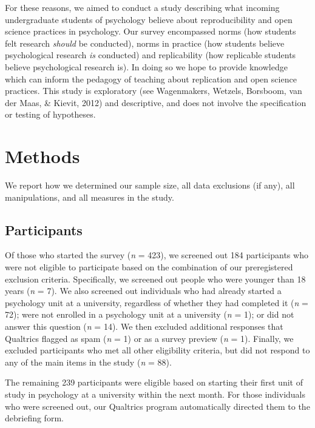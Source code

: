 \documentclass[
  man,mask,floatsintext]{apa6}
\begin{document}
For these reasons, we aimed to conduct a study describing what incoming undergraduate students of psychology believe about reproducibility and open science practices in psychology. Our survey encompassed norms (how students felt research \emph{should} be conducted), norms in practice (how students believe psychological research \emph{is} conducted) and replicability (how replicable students believe psychological research is). In doing so we hope to provide knowledge which can inform the pedagogy of teaching about replication and open science practices. This study is exploratory (see Wagenmakers, Wetzels, Borsboom, van der Maas, \& Kievit, 2012) and descriptive, and does not involve the specification or testing of hypotheses.

\hypertarget{methods}{%
\section{Methods}\label{methods}}

We report how we determined our sample size, all data exclusions (if any), all manipulations, and all measures in the study.

\hypertarget{participants}{%
\subsection{Participants}\label{participants}}

Of those who started the survey (\emph{n} = 423), we screened out 184
participants who were not eligible to participate based on the combination of our
preregistered exclusion criteria. Specifically, we screened out people who were younger than
18 years (\emph{n} = 7). We also screened out individuals who had already
started a psychology unit at a university, regardless of whether they had
completed it (\emph{n} = 72); were not enrolled in a
psychology unit at a university (\emph{n} = 1); or did not answer this
question (\emph{n} = 14). We then excluded additional responses that
Qualtrics flagged as spam (\emph{n} = 1) or as a survey preview
(\emph{n} = 1). Finally, we excluded participants who met all other
eligibility criteria, but did not respond to any of the main items
in the study (\emph{n} = 88).

The remaining 239 participants were eligible based on starting their first unit
of study in psychology at a university within the next month. For those individuals
who were screened out, our Qualtrics program automatically directed them to the
debriefing form.
\end{document}

